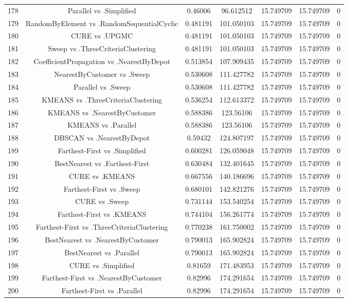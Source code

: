 \documentclass[a4paper,10pt]{article}
\begin{document}
\begin{landscape}
\begin{table}[!htp]
\begin{tabular}{ccccccc}
178&Parallel vs .Simplified&0.46006&96.612512&15.749709&15.749709&0\\
179&RandomByElement vs .RandomSequentialCyclic&0.481191&101.050103&15.749709&15.749709&0\\
180&CURE vs .UPGMC&0.481191&101.050103&15.749709&15.749709&0\\
181&Sweep vs .ThreeCriteriaClustering&0.481191&101.050103&15.749709&15.749709&0\\
182&CoefficientPropagation vs .NearestByDepot&0.513854&107.909435&15.749709&15.749709&0\\
183&NearestByCustomer vs .Sweep&0.530608&111.427782&15.749709&15.749709&0\\
184&Parallel vs .Sweep&0.530608&111.427782&15.749709&15.749709&0\\
185&KMEANS vs .ThreeCriteriaClustering&0.536254&112.613372&15.749709&15.749709&0\\
186&KMEANS vs .NearestByCustomer&0.588386&123.56106&15.749709&15.749709&0\\
187&KMEANS vs .Parallel&0.588386&123.56106&15.749709&15.749709&0\\
188&DBSCAN vs .NearestByDepot&0.59432&124.807197&15.749709&15.749709&0\\
189&Farthest-First vs .Simplified&0.600281&126.059048&15.749709&15.749709&0\\
190&BestNearest vs .Farthest-First&0.630484&132.401645&15.749709&15.749709&0\\
191&CURE vs .KMEANS&0.667556&140.186696&15.749709&15.749709&0\\
192&Farthest-First vs .Sweep&0.680101&142.821276&15.749709&15.749709&0\\
193&CURE vs .Sweep&0.731144&153.540254&15.749709&15.749709&0\\
194&Farthest-First vs .KMEANS&0.744104&156.261774&15.749709&15.749709&0\\
195&Farthest-First vs .ThreeCriteriaClustering&0.770238&161.750002&15.749709&15.749709&0\\
196&BestNearest vs .NearestByCustomer&0.790013&165.902824&15.749709&15.749709&0\\
197&BestNearest vs .Parallel&0.790013&165.902824&15.749709&15.749709&0\\
198&CURE vs .Simplified&0.81659&171.483953&15.749709&15.749709&0\\
199&Farthest-First vs .NearestByCustomer&0.82996&174.291654&15.749709&15.749709&0\\
200&Farthest-First vs .Parallel&0.82996&174.291654&15.749709&15.749709&0\\

\end{tabular}
\end{table}
\end{landscape}
\end{document}
